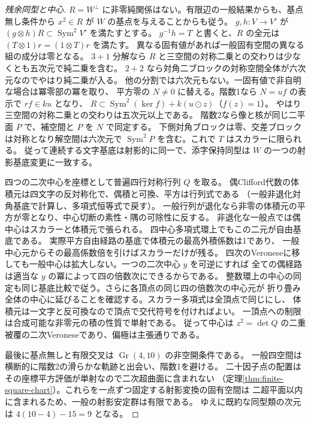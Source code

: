 \begin{proof}[残余同型と中心]
$R=W^\perp$ に非零純関係はない。有限辺の一般結果からも、基点無し条件から
$x^2\in R$ が $W$ の基点を与えることからも従う。
$g,h:V\to V'$ が $(g\otimes h)R\subset\operatorname{Sym}^2V'$ を満たすとする。
$g^{-1}h=T$ と書くと、$R$ の全元は $(T\otimes1)r=(1\otimes T)r$ を満たす。
異なる固有値があれば一般固有空間の異なる組の成分は零となる。
$3+1$ 分解なら $R$ と三空間の対称二乗との交わりは少なくとも五次元で純二乗を含む。
$2+2$ なら対角二ブロックの対称空間全体が六次元なのでやはり純二乗が入る。
他の分割では六次元もない。一固有値で非自明な場合は冪零部の冪を取り、
平方零の $N\ne0$ に替える。階数1なら $N=u f$ の表示で $r f\in ku$ となり、
$R\subset\operatorname{Sym}^2(\ker f)+k(u\odot z)$（$f(z)=1$）。
やはり三空間の対称二乗との交わりは五次元以上である。
階数2なら像と核が同じ二平面 $P$ で、補空間と $P$ を $N$ で同定する。
下側対角ブロックは零、交差ブロックは対称となり解空間は六次元で
$\operatorname{Sym}^2P$ を含む。これで $T$ はスカラーに限られる。
従って連続する文字基底は射影的に同一で、添字保持同型は $W$ の一つの射影基底変更に一致する。

四つの二次中心を座標として普遍四行対称行列 $Q$ を取る。
偶Clifford代数の体積元は四文字の反対称化で、偶積と可換、平方は行列式である
（一般非退化対角基底で計算し、多項式恒等式で戻す）。
一般行列が退化なら非零の体積元の平方が零となり、中心切断の素性・隅の可除性に反する。
非退化な一般点では偶中心はスカラーと体積元で張られる。
四中心多項式環上でもこの二元が自由基底である。
実際平方自由経路の基底で体積元の最高外積係数は1であり、
一般中心元からその最高係数倍を引けばスカラーだけが残る。
四次のVeroneseに移しても一般中心は拡大しない。一つの二次中心 $y$ を可逆にすれば
全ての偶経路は適当な $y$ の冪によって四の倍数次にできるからである。
整数環上の中心の同定も同じ基底比較で従う。さらに各頂点の同じ四の倍数次の中心元が
折り畳み全体の中心に延びることを確認する。スカラー多項式は全頂点で同じにし、
体積元は一文字と反可換なので頂点で交代符号を付ければよい。
一頂点への制限は合成可能な非零元の積の性質で単射である。
従って中心は $z^2=\det Q$ の二重被覆の二次Veroneseであり、偏極は主張通りである。

最後に基点無しと有限交叉は $\operatorname{Gr}(4,10)$ の非空開条件である。
一般四空間は横断的に階数2の滑らかな軌跡と出会い、階数1を避ける。
二十因子点の配置はその座標平方評価が単射なので二次超曲面に含まれない
（定理\ref{thm:finite-square-chart}）。これらを一点ずつ固定する射影変換の固有空間は
二超平面以内に含まれるため、一般の射影安定群は有限である。
ゆえに既約な同型類の次元は $4(10-4)-15=9$ となる。
\end{proof}
